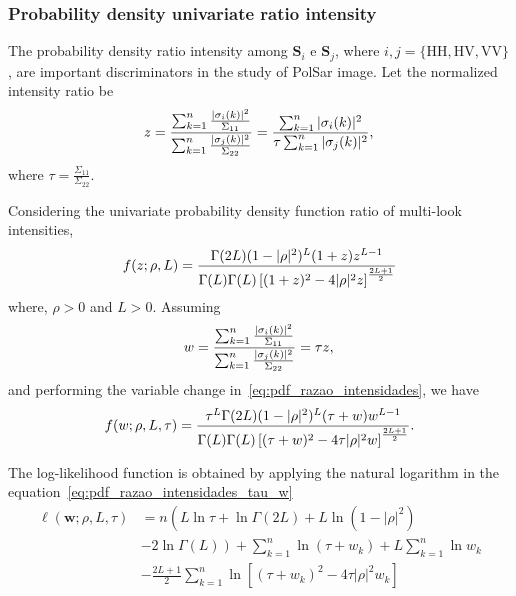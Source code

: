 \documentclass[journal]{IEEEtran}
\begin{document}
\subsubsection{Probability density univariate ratio intensity}

The probability density ratio intensity among $\mathbf{S}_i$ e $\mathbf{S}_j$, where $i,j=\{\text{HH},\text{HV}, \text{VV}\}$, are important discriminators in the study of PolSar image. Let the normalized intensity ratio be  
\begin{equation}\label{eq:razao_intensidades}
 z=\frac{\sum_{k=1}^{n}\frac{|\mathbf{\sigma}_i(k)|^2}{\Sigma_{11}}}{\sum_{k=1}^{n}\frac{|\mathbf{\sigma}_j(k)|^2}{\Sigma_{22}}}=\frac{\sum_{k=1}^{n}|\mathbf{\sigma}_i(k)|^2}{\tau\sum_{k=1}^{n}|\mathbf{\sigma}_j(k)|^2},\\
\end{equation}
where $\tau=\frac{\Sigma_{11}}{\Sigma_{22}}$.
  
Considering the univariate probability density function ratio of multi-look intensities,
\begin{equation}\label{eq:pdf_razao_intensidades}
	f(z;\rho,L)=\frac{\Gamma(2L)(1-|\rho|^2)^{L}(1+z)z^{L-1}}{\Gamma(L)\Gamma(L)\left[(1+z)^2-4|\rho|^2z \right]^{\frac{2L+1}{2}}}\\
\end{equation}
where, $\rho>0$ and $L>0$.  Assuming
\begin{equation}\label{eq:razao_intensidades_w}
 w=\frac{\sum_{k=1}^{n}\frac{|\mathbf{\sigma}_i(k)|^2}{\Sigma_{11}}}{\sum_{k=1}^{n}\frac{|\mathbf{\sigma}_j(k)|^2}{\Sigma_{22}}}=\tau z,\\ 
\end{equation} 
and performing the variable change in~\eqref{eq:pdf_razao_intensidades}, we have 
\begin{equation}\label{eq:pdf_razao_intensidades_tau_w}
	f(w;\rho,L,\tau)=\frac{\tau^L\Gamma(2L)(1-|\rho|^2)^{L}(\tau+w)w^{L-1}}{\Gamma(L)\Gamma(L)\left[(\tau+w)^2-4\tau|\rho|^2w \right]^{\frac{2L+1}{2}}}.\\
\end{equation}

The log-likelihood function is obtained by applying the natural logarithm in the equation~\eqref{eq:pdf_razao_intensidades_tau_w} 
\begin{equation}\label{eq_log_vero_razao_intensidade_red_tau_w}
\begin{split}
    \ell(\bm w;\rho, L, \tau)&=n\left(L\ln\tau +\ln\Gamma(2L)+L\ln(1-|\rho|^2)\right.\\
                         &-\left.2\ln\Gamma(L)\right) +\sum_{k=1}^{n}\ln(\tau+w_k)+L\sum_{k=1}^{n}\ln w_k\\
                         &-\frac{2L+1}{2}\sum_{k=1}^{n} \ln\left[(\tau+w_k)^2-4\tau|\rho|^2w_k\right]\\
\end{split}
 \end{equation} 
%
\end{document}
